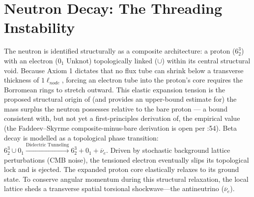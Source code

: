 
\section{Neutron Decay: The Threading Instability}

The neutron is identified structurally as a composite architecture: a proton ($6_{2}^{3}$) with an electron ($0_{1}$ Unknot) topologically linked ($\cup$) within its central structural void. Because Axiom 1 dictates that no flux tube can shrink below a transverse thickness of $1 \ell_{node}$, forcing an electron tube into the proton's core requires the Borromean rings to stretch outward. This elastic expansion tension is the proposed structural origin of (and provides an upper-bound estimate for) the mass surplus the neutron possesses relative to the bare proton --- a bound consistent with, but not yet a first-principles derivation of, the empirical value (the Faddeev--Skyrme composite-minus-bare derivation is open per  :54). Beta decay is modelled as a topological phase transition: $6_{2}^{3}\cup 0_{1} \xrightarrow{\text{Dielectric Tunneling}} 6_{2}^{3}+0_{1}+\overline{\nu}_{e}$. Driven by stochastic background lattice perturbations (CMB noise), the tensioned electron eventually slips its topological lock and is ejected. The expanded proton core elastically relaxes to its ground state. To conserve angular momentum during this structural relaxation, the local lattice sheds a transverse spatial torsional shockwave---the antineutrino ($\overline{\nu}_{e}$).

